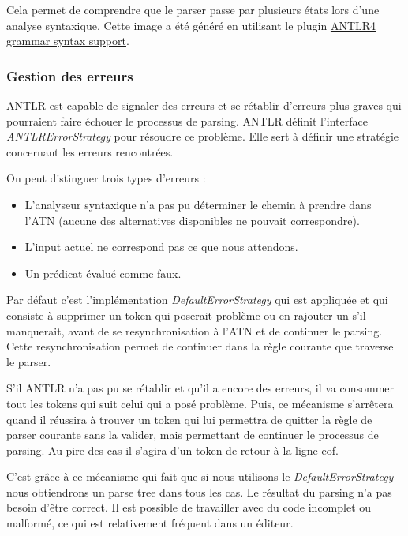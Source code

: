 \documentclass[
    iict, %
    il, %
]{heig-tb}
\begin{document}
Cela permet de comprendre que le parser passe par plusieurs états lors d'une analyse syntaxique.
Cette image a été généré en utilisant le plugin \href{https://marketplace.visualstudio.com/items?itemName=mike-lischke.vscode-antlr4}{ANTLR4 grammar syntax support}.

\subsubsection{Gestion des erreurs}

ANTLR est capable de signaler des erreurs et se rétablir d'erreurs plus graves qui pourraient faire échouer le processus de parsing.
ANTLR définit l'interface \emph{ANTLRErrorStrategy} pour résoudre ce problème.
Elle sert à définir une stratégie concernant les erreurs rencontrées.

On peut distinguer trois types d'erreurs \cite{ANTLRErrorStrategy} :
\begin{itemize}
    \item L'analyseur syntaxique n'a pas pu déterminer le chemin à prendre dans l'ATN (aucune des alternatives disponibles ne pouvait correspondre).
    \item L'input actuel ne correspond pas ce que nous attendons.
    \item Un prédicat évalué comme faux.
\end{itemize}

Par défaut c'est l'implémentation \emph{DefaultErrorStrategy} qui est appliquée et qui consiste à supprimer un token qui poserait problème ou en rajouter un s'il manquerait, avant de
se resynchronisation à l'ATN et de continuer le parsing. Cette resynchronisation permet de continuer dans la règle courante que traverse le parser. \cite{antlrs-error-handling-strategy}

S'il ANTLR n'a pas pu se rétablir et qu'il a encore des erreurs, il va consommer tout les tokens qui suit celui qui a posé problème.
Puis, ce mécanisme s'arrêtera quand il réussira à trouver un token qui lui permettra de quitter la règle de parser courante sans la valider, mais permettant de continuer le processus de parsing.
Au pire des cas il s'agira d'un token de retour à la ligne \Gls{eof}.

C'est grâce à ce mécanisme qui fait que si nous utilisons le \emph{DefaultErrorStrategy} nous obtiendrons un parse tree dans tous les cas.
Le résultat du parsing n'a pas besoin d'être correct. Il est possible de travailler avec du code incomplet ou malformé, ce qui est relativement fréquent dans un éditeur.
\end{document}
